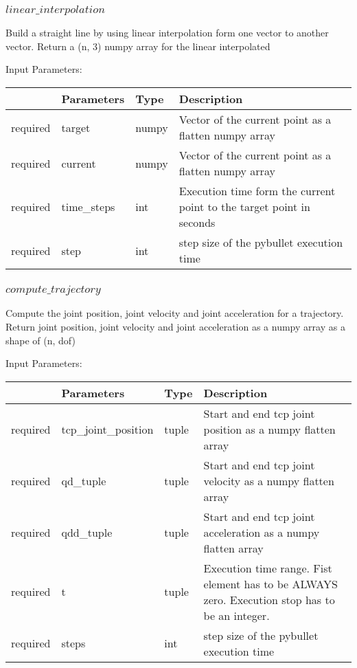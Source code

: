 \documentclass[
	ngerman,
	accentcolor=9c,%
	type=intern,
	marginpar=false
	]{tudapub}
\begin{document}
\subsubsection{$linear\_interpolation$}
\noindent Build a straight line by using linear interpolation form one vector to another vector. Return a (n, 3) numpy array for the linear interpolated

\vspace{0.5cm}
\noindent Input Parameters:
\vspace{0.5cm}

\begin{tabular}{|p{}|p{}|p{}| p{}|}
\hline
 & \textbf{Parameters} & \textbf{Type} & \textbf{Description} \\
\hline
required & target & numpy & Vector of the current point as a flatten numpy array\\
\hline
required & current & numpy & Vector of the current point as a flatten numpy array\\
\hline
required & time\_steps & int & Execution time form the current point to the target point in seconds\\
\hline
required & step & int & step size of the pybullet execution time\\
\hline
\end{tabular}
\vspace{1cm}



\subsubsection{$compute\_trajectory$}
\noindent Compute the joint position, joint velocity and joint acceleration for a trajectory. Return joint position, joint velocity and joint acceleration as a numpy array as a shape of (n, dof)

\vspace{0.5cm}
\noindent Input Parameters:
\vspace{0.5cm}

\begin{tabular}{|p{}|p{}|p{}| p{}|}
\hline
 & \textbf{Parameters} & \textbf{Type} & \textbf{Description} \\
\hline
required & tcp\_joint\_position & tuple & Start and end tcp joint position as a numpy flatten array\\
\hline
required & qd\_tuple & tuple & Start and end tcp joint velocity as a numpy flatten array\\
\hline
required & qdd\_tuple & tuple & Start and end tcp joint acceleration as a numpy flatten array\\
\hline
required & t & tuple & Execution time range. Fist element has to be ALWAYS zero. Execution stop has to be an integer.\\
\hline
required & steps & int & step size of the pybullet execution time\\
\hline
\end{tabular}
\vspace{1cm}
\end{document}
